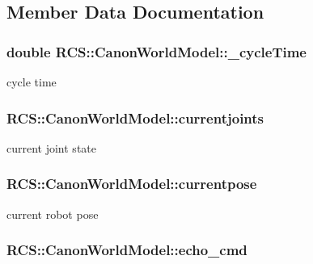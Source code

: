 \subsection{Member Data Documentation}
\hypertarget{structRCS_1_1CanonWorldModel_a8b14e4665c3491b8a68977dbf84c9479}{
\subsubsection[{\-\_\-cycle\-Time}]{\setlength{\rightskip}{0pt plus 5cm}double R\-C\-S\-::\-Canon\-World\-Model\-::\-\_\-cycle\-Time}}\label{structRCS_1_1CanonWorldModel_a8b14e4665c3491b8a68977dbf84c9479}
cycle time \hypertarget{structRCS_1_1CanonWorldModel_a0060a81cde9ecf9ae02c5e61b8345a5b}{
\subsubsection[{currentjoints}]{ R\-C\-S\-::\-Canon\-World\-Model\-::currentjoints}}\label{structRCS_1_1CanonWorldModel_a0060a81cde9ecf9ae02c5e61b8345a5b}
current joint state \hypertarget{structRCS_1_1CanonWorldModel_a7220d95245ac8a787e35efb2cc399cb5}{
\subsubsection[{currentpose}]{ R\-C\-S\-::\-Canon\-World\-Model\-::currentpose}}\label{structRCS_1_1CanonWorldModel_a7220d95245ac8a787e35efb2cc399cb5}
current robot pose \hypertarget{structRCS_1_1CanonWorldModel_aed51034c2dd7b1a78722fe7444691132}{
\subsubsection[{echo\-\_\-cmd}]{ R\-C\-S\-::\-Canon\-World\-Model\-::echo\-\_\-cmd}}\label{structRCS_1_1CanonWorldModel_aed51034c2dd7b1a78722fe7444691132}

